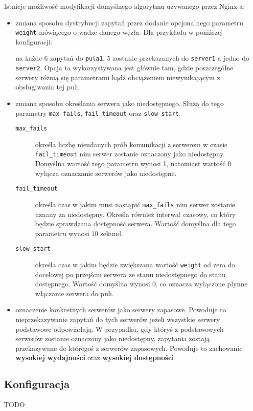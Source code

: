 {Istnieje możliwość modyfikacji domyślnego algorytmu używanego przez Nginx-a:
\begin{itemize}
	\item zmiana sposobu dystrybucji zapytań przez dodanie opcjonalnego parametru \texttt{weight} mówiącego o wadze danego węzła. Dla przykładu w poniższej konfiguracji:
	
	na każde 6 zapytań do \texttt{pula1}, 5 zostanie przekazanych do \texttt{server1} a jedno do \texttt{server2}.
	Opcja ta wykorzystywana jest głównie tam, gdzie poszczególne serwery różnią się parametrami bądź obciążeniem niewynikającym z obsługiwania tej puli.
	\item zmiana sposobu określania serwera jako niedostępnego.
	Służą do tego parametry \texttt{max\_fails}, \texttt{fail\_timeout} oraz \texttt{slow\_start}.\\
	\begin{description}
	\item[\texttt{max\_fails}] określa liczbę nieudanych prób komunikacji z serwerem w czasie \texttt{fail\_timeout} nim serwer zostanie oznaczony jako niedostępny.
	Domyślna wartość tego parametru wynosi 1, natomiast wartość 0 wyłącza oznaczanie serwerów jako niedostępne.
	\item[\texttt{fail\_timeout}] określa czas w jakim musi nastąpić \texttt{max\_fails} nim serwer zostanie uznany za niedostępny.
	Określa również interwał czasowy, co który będzie sprawdzana dostępność serwera.
	Wartość domyślna dla tego parametru wynosi 10 sekund.
	\item[\texttt{slow\_start}] określa czas w jakim będzie zwiększana wartość \texttt{weight} od zera do docelowej po przejściu serwera ze stanu niedostępnego do stanu dostępnego.
	Wartość domyślna wynosi 0, co oznacza wyłączone płynne włączanie serwera do puli.
	\end{description}
	\item oznaczenie konkretnych serwerów jako serwery zapasowe.  
	Powoduje to nieprzekazywanie zapytań do tych serwerów jeżeli wszystkie serwery podstawowe odpowiadają.
	W przypadku, gdy któryś z podstawowych serwerów zostanie oznaczony jako niedostępny, zapytania zostają przekazywane do któregoś z serwerów zapasowych.
	Powoduje to zachowanie \textbf{wysokiej wydajności} oraz \textbf{wysokiej dostępności}.	
\end{itemize}
\subsection{Konfiguracja}
TODO
}
